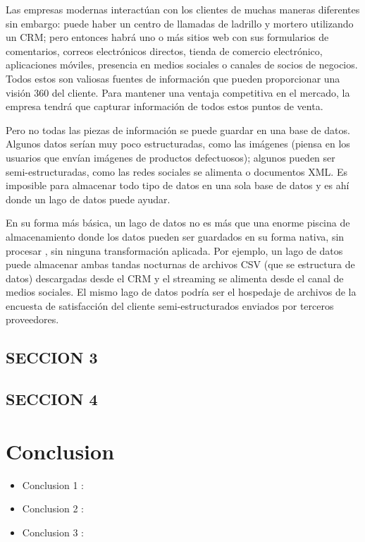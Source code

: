 \documentclass[preprint,12pt]{elsarticle}
\begin{document}
\begin{itemize}
Las empresas modernas interactúan con los clientes de muchas maneras diferentes sin embargo: puede haber un centro de llamadas de ladrillo y mortero utilizando un CRM; pero entonces habrá uno o más sitios web con sus formularios de comentarios, correos electrónicos directos, tienda de comercio electrónico, aplicaciones móviles, presencia en medios sociales o canales de socios de negocios. Todos estos son valiosas fuentes de información que pueden proporcionar una visión 360 del cliente. Para mantener una ventaja competitiva en el mercado, la empresa tendrá que capturar información de todos estos puntos de venta.

Pero no todas las piezas de información se puede guardar en una base de datos. Algunos datos serían muy poco estructuradas, como las imágenes (piensa en los usuarios que envían imágenes de productos defectuosos); algunos pueden ser semi-estructuradas, como las redes sociales se alimenta o documentos XML. Es imposible para almacenar todo tipo de datos en una sola base de datos y es ahí donde un lago de datos puede ayudar.

En su forma más básica, un lago de datos no es más que una enorme piscina de almacenamiento donde los datos pueden ser guardados en su forma nativa, sin procesar , sin ninguna transformación aplicada. Por ejemplo, un lago de datos puede almacenar ambas tandas nocturnas de archivos CSV (que se estructura de datos) descargadas desde el CRM y el streaming se alimenta desde el canal de medios sociales. El mismo lago de datos podría ser el hospedaje de archivos de la encuesta de satisfacción del cliente semi-estructurados enviados por terceros proveedores.

\end{itemize}


\subsection{SECCION 3}	


\subsection{SECCION 4}	


\section{Conclusion}
\begin{itemize}
\item Conclusion 1 : \\

\item Conclusion 2 : \\

\item Conclusion 3 : \\



\end{itemize}
	
\end{document}
